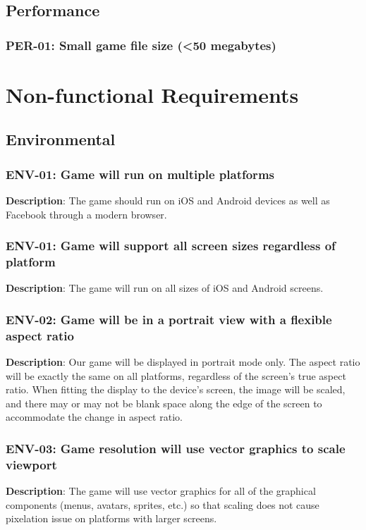 \section{Performance}

\subsection{PER-01: Small game file size (<50 megabytes)}
\chapter{Non-functional Requirements}

\section{Environmental}

\subsection{ENV-01: Game will run on multiple platforms}
\textbf{Description}: The game should run on iOS and Android devices as well
as Facebook through a modern browser.

\subsection{ENV-01: Game will support all screen sizes regardless of platform}
\textbf{Description}: The game will run on all sizes of iOS and Android screens.

\subsection{ENV-02: Game will be in a portrait view with a flexible aspect ratio}
\textbf{Description}: Our game will be displayed in portrait mode only. The
aspect ratio will be exactly the same on all platforms, regardless
of the screen\textquoteright{}s true aspect ratio. When fitting the
display to the device\textquoteright{}s screen, the image will be
scaled, and there may or may not be blank space along the edge of
the screen to accommodate the change in aspect ratio.

\subsection{ENV-03: Game resolution will use vector graphics to scale viewport}
\textbf{Description}: The game will use vector graphics for all of
the graphical components (menus, avatars, sprites, etc.) so that scaling
does not cause pixelation issue on platforms with larger screens. 

